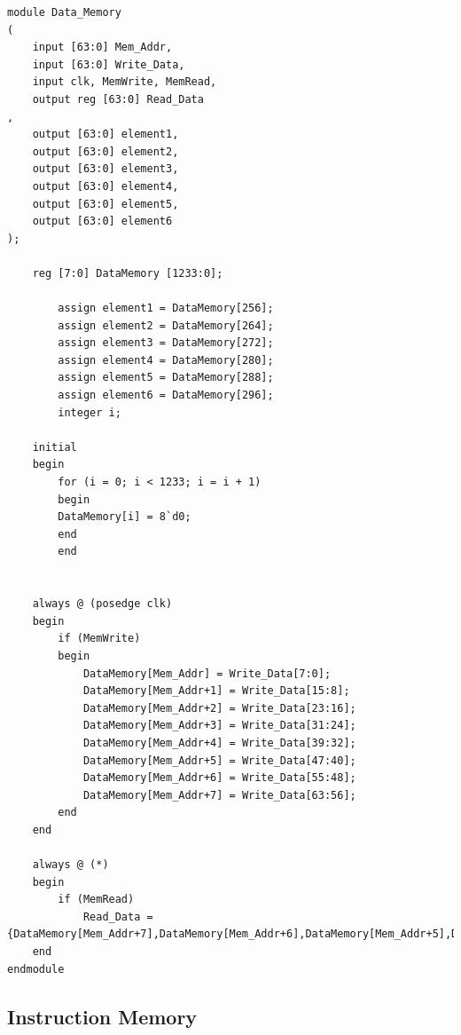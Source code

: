 \documentclass{article}
\begin{document}
\begin{lstlisting}[caption={Changes to Data Memory}, captionpos=b, language=RISC-V]
module Data_Memory
(
    input [63:0] Mem_Addr,
    input [63:0] Write_Data,
    input clk, MemWrite, MemRead,
    output reg [63:0] Read_Data
, 
    output [63:0] element1,
    output [63:0] element2,
    output [63:0] element3,
    output [63:0] element4,
    output [63:0] element5,
    output [63:0] element6
);

    reg [7:0] DataMemory [1233:0];

        assign element1 = DataMemory[256];
        assign element2 = DataMemory[264];
        assign element3 = DataMemory[272];                      
        assign element4 = DataMemory[280];
        assign element5 = DataMemory[288];
        assign element6 = DataMemory[296];
        integer i;
    
    initial  
    begin 
        for (i = 0; i < 1233; i = i + 1)
        begin 
        DataMemory[i] = 8`d0;
        end
        end    

    
    always @ (posedge clk)
    begin
        if (MemWrite)
        begin
            DataMemory[Mem_Addr] = Write_Data[7:0];
            DataMemory[Mem_Addr+1] = Write_Data[15:8];
            DataMemory[Mem_Addr+2] = Write_Data[23:16];
            DataMemory[Mem_Addr+3] = Write_Data[31:24];
            DataMemory[Mem_Addr+4] = Write_Data[39:32];
            DataMemory[Mem_Addr+5] = Write_Data[47:40];
            DataMemory[Mem_Addr+6] = Write_Data[55:48];
            DataMemory[Mem_Addr+7] = Write_Data[63:56];
        end
    end
    
    always @ (*)
    begin
        if (MemRead)
            Read_Data = {DataMemory[Mem_Addr+7],DataMemory[Mem_Addr+6],DataMemory[Mem_Addr+5],DataMemory[Mem_Addr+4],DataMemory[Mem_Addr+3],DataMemory[Mem_Addr+2],DataMemory[Mem_Addr+1],DataMemory[Mem_Addr]};
    end
endmodule
\end{lstlisting}

\subsection{Instruction Memory}
\end{document}
